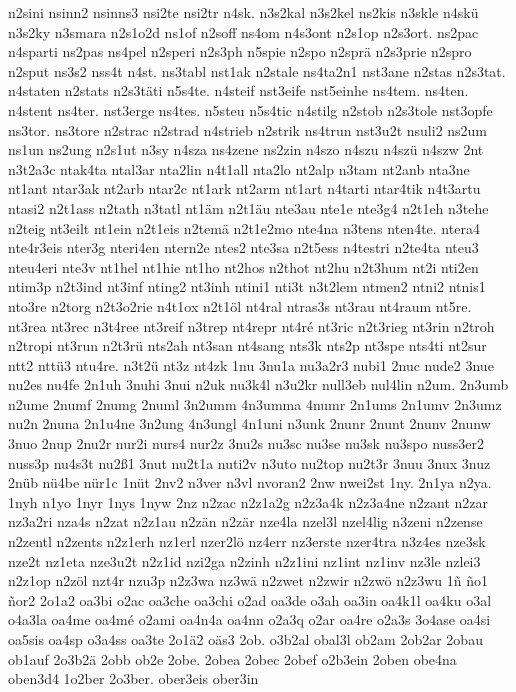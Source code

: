 {n2sini
nsinn2
nsinns3
nsi2te
nsi2tr
n4sk.
n3s2kal
n3s2kel
ns2kis
n3skle
n4skü
n3s2ky
n3smara
n2s1o2d
ns1of
n2soff
ns4om
n4s3ont
n2s1op
n2s3ort.
ns2pac
n4sparti
ns2pas
ns4pel
n2speri
n2s3ph
n5spie
n2spo
n2sprä
n2s3prie
n2spro
n2sput
ns3s2
nss4t
n4st.
ns3tabl
nst1ak
n2stale
ns4ta2n1
nst3ane
n2stas
n2s3tat.
n4staten
n2stats
n2s3täti
n5s4te.
n4steif
nst3eife
nst5einhe
ns4tem.
ns4ten.
n4stent
ns4ter.
nst3erge
ns4tes.
n5steu
n5s4tic
n4stilg
n2stob
n2s3tole
nst3opfe
ns3tor.
ns3tore
n2strac
n2strad
n4strieb
n2strik
ns4trun
nst3u2t
nsuli2
ns2um
ns1un
ns2ung
n2s1ut
n3sy
n4sza
ns4zene
ns2zin
n4szo
n4szu
n4szü
n4szw
2nt
n3t2a3c
ntak4ta
ntal3ar
nta2lin
n4t1all
nta2lo
nt2alp
n3tam
nt2anb
nta3ne
nt1ant
ntar3ak
nt2arb
ntar2c
nt1ark
nt2arm
nt1art
n4tarti
ntar4tik
n4t3artu
ntasi2
n2t1ass
n2tath
n3tatl
nt1äm
n2t1äu
nte3au
nte1e
nte3g4
n2t1eh
n3tehe
n2teig
nt3eilt
nt1ein
n2t1eis
n2temä
n2t1e2mo
nte4na
n3tens
nten4te.
ntera4
nte4r3eis
nter3g
nteri4en
ntern2e
ntes2
nte3sa
n2t5ess
n4testri
n2te4ta
nteu3
nteu4eri
nte3v
nt1hel
nt1hie
nt1ho
nt2hos
n2thot
nt2hu
n2t3hum
nt2i
nti2en
ntim3p
n2t3ind
nt3inf
nting2
nt3inh
ntini1
nti3t
n3t2lem
ntmen2
ntni2
ntnis1
nto3re
n2torg
n2t3o2rie
n4t1ox
n2t1öl
nt4ral
ntras3s
nt3rau
nt4raum
nt5re.
nt3rea
nt3rec
n3t4ree
nt3reif
n3trep
nt4repr
nt4ré
nt3ric
n2t3rieg
nt3rin
n2troh
n2tropi
nt3run
n2t3rü
nts2ah
nt3san
nt4sang
nts3k
nts2p
nt3spe
nts4ti
nt2sur
ntt2
nttü3
ntu4re.
n3t2ü
nt3z
nt4zk
1nu
3nu1a
nu3a2r3
nubi1
2nuc
nude2
3nue
nu2es
nu4fe
2n1uh
3nuhi
3nui
n2uk
nu3k4l
n3u2kr
null3eb
nul4lin
n2um.
2n3umb
n2ume
2numf
2numg
2numl
3n2umm
4n3umma
4numr
2n1ums
2n1umv
2n3umz
nu2n
2nuna
2n1u4ne
3n2ung
4n3ungl
4n1uni
n3unk
2nunr
2nunt
2nunv
2nunw
3nuo
2nup
2nu2r
nur2i
nurs4
nur2z
3nu2s
nu3sc
nu3se
nu3sk
nu3spo
nuss3er2
nuss3p
nu4s3t
nu2ß1
3nut
nu2t1a
nuti2v
n3uto
nu2top
nu2t3r
3nuu
3nux
3nuz
2nüb
nü4be
nür1c
1nüt
2nv2
n3ver
n3vl
nvoran2
2nw
nwei2st
1ny.
2n1ya
n2ya.
1nyh
n1yo
1nyr
1nys
1nyw
2nz
n2zac
n2z1a2g
n2z3a4k
n2z3a4ne
n2zant
n2zar
nz3a2ri
nza4s
n2zat
n2z1au
n2zän
n2zär
nze4la
nzel3l
nzel4lig
n3zeni
n2zense
n2zentl
n2zents
n2z1erh
nz1erl
nzer2lö
nz4err
nz3erste
nzer4tra
n3z4es
nze3sk
nze2t
nz1eta
nze3u2t
n2z1id
nzi2ga
n2zinh
n2z1ini
nz1int
nz1inv
nz3le
nzlei3
n2z1op
n2zöl
nzt4r
nzu3p
n2z3wa
nz3wä
n2zwet
n2zwir
n2zwö
n2z3wu
1ñ
ño1
ñor2
2o1a2
oa3bi
o2ac
oa3che
oa3chi
o2ad
oa3de
o3ah
oa3in
oa4k1l
oa4ku
o3al
o4a3la
oa4me
oa4mé
o2ami
oa4n4a
oa4nn
o2a3q
o2ar
oa4re
o2a3s
3o4ase
oa4si
oa5sis
oa4sp
o3a4ss
oa3te
2o1ä2
oäs3
2ob.
o3b2al
obal3l
ob2am
2ob2ar
2obau
ob1auf
2o3b2ä
2obb
ob2e
2obe.
2obea
2obec
2obef
o2b3ein
2oben
obe4na
oben3d4
1o2ber
2o3ber.
ober3eis
ober3in
}
